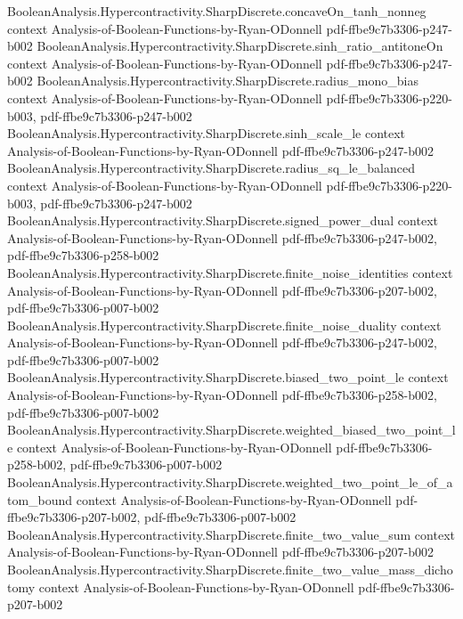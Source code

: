 \begin{theorem}
\proofstep
  {BooleanAnalysis.Hypercontractivity.SharpDiscrete.concaveOn_tanh_nonneg}
  {context}
  {Analysis-of-Boolean-Functions-by-Ryan-ODonnell}
  {pdf-ffbe9c7b3306-p247-b002}
\proofstep
  {BooleanAnalysis.Hypercontractivity.SharpDiscrete.sinh_ratio_antitoneOn}
  {context}
  {Analysis-of-Boolean-Functions-by-Ryan-ODonnell}
  {pdf-ffbe9c7b3306-p247-b002}
\proofstep
  {BooleanAnalysis.Hypercontractivity.SharpDiscrete.radius_mono_bias}
  {context}
  {Analysis-of-Boolean-Functions-by-Ryan-ODonnell}
  {pdf-ffbe9c7b3306-p220-b003,
    pdf-ffbe9c7b3306-p247-b002}
\proofstep
  {BooleanAnalysis.Hypercontractivity.SharpDiscrete.sinh_scale_le}
  {context}
  {Analysis-of-Boolean-Functions-by-Ryan-ODonnell}
  {pdf-ffbe9c7b3306-p247-b002}
\proofstep
  {BooleanAnalysis.Hypercontractivity.SharpDiscrete.radius_sq_le_balanced}
  {context}
  {Analysis-of-Boolean-Functions-by-Ryan-ODonnell}
  {pdf-ffbe9c7b3306-p220-b003,
    pdf-ffbe9c7b3306-p247-b002}
\proofstep
  {BooleanAnalysis.Hypercontractivity.SharpDiscrete.signed_power_dual}
  {context}
  {Analysis-of-Boolean-Functions-by-Ryan-ODonnell}
  {pdf-ffbe9c7b3306-p247-b002,
    pdf-ffbe9c7b3306-p258-b002}
\proofstep
  {BooleanAnalysis.Hypercontractivity.SharpDiscrete.finite_noise_identities}
  {context}
  {Analysis-of-Boolean-Functions-by-Ryan-ODonnell}
  {pdf-ffbe9c7b3306-p207-b002,
    pdf-ffbe9c7b3306-p007-b002}
\proofstep
  {BooleanAnalysis.Hypercontractivity.SharpDiscrete.finite_noise_duality}
  {context}
  {Analysis-of-Boolean-Functions-by-Ryan-ODonnell}
  {pdf-ffbe9c7b3306-p247-b002,
    pdf-ffbe9c7b3306-p007-b002}
\proofstep
  {BooleanAnalysis.Hypercontractivity.SharpDiscrete.biased_two_point_le}
  {context}
  {Analysis-of-Boolean-Functions-by-Ryan-ODonnell}
  {pdf-ffbe9c7b3306-p258-b002,
    pdf-ffbe9c7b3306-p007-b002}
\proofstep
  {BooleanAnalysis.Hypercontractivity.SharpDiscrete.weighted_biased_two_point_le}
  {context}
  {Analysis-of-Boolean-Functions-by-Ryan-ODonnell}
  {pdf-ffbe9c7b3306-p258-b002,
    pdf-ffbe9c7b3306-p007-b002}
\proofstep
  {BooleanAnalysis.Hypercontractivity.SharpDiscrete.weighted_two_point_le_of_atom_bound}
  {context}
  {Analysis-of-Boolean-Functions-by-Ryan-ODonnell}
  {pdf-ffbe9c7b3306-p207-b002,
    pdf-ffbe9c7b3306-p007-b002}
\proofstep
  {BooleanAnalysis.Hypercontractivity.SharpDiscrete.finite_two_value_sum}
  {context}
  {Analysis-of-Boolean-Functions-by-Ryan-ODonnell}
  {pdf-ffbe9c7b3306-p207-b002}
\proofstep
  {BooleanAnalysis.Hypercontractivity.SharpDiscrete.finite_two_value_mass_dichotomy}
  {context}
  {Analysis-of-Boolean-Functions-by-Ryan-ODonnell}
  {pdf-ffbe9c7b3306-p207-b002}

\end{theorem}

